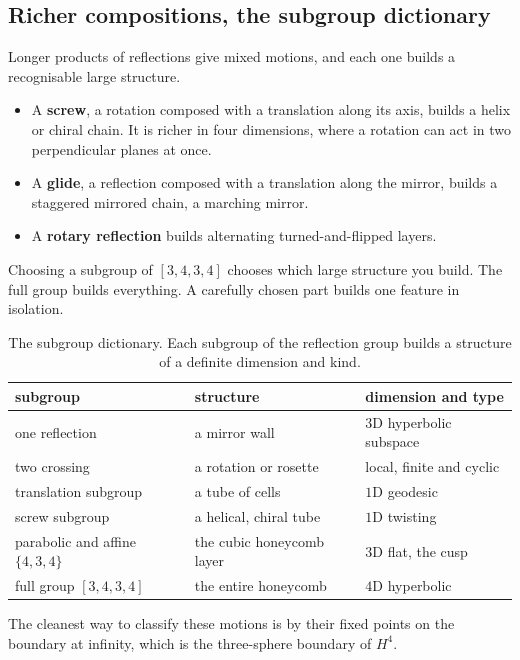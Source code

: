 \subsection{Richer compositions, the subgroup dictionary}

Longer products of reflections give mixed motions, and each one builds a recognisable large structure.

\begin{itemize}
\item A \textbf{screw}, a rotation composed with a translation along its axis, builds a helix or chiral chain. It is richer in four dimensions, where a rotation can act in two perpendicular planes at once.
\item A \textbf{glide}, a reflection composed with a translation along the mirror, builds a staggered mirrored chain, a marching mirror.
\item A \textbf{rotary reflection} builds alternating turned-and-flipped layers.
\end{itemize}

Choosing a subgroup of $[3,4,3,4]$ chooses which large structure you build. The full group builds everything. A carefully chosen part builds one feature in isolation.

\begin{table}[ht]
\centering
\begin{tabular}{@{}lll@{}}
\toprule
subgroup & structure & dimension and type \\
\midrule
one reflection & a mirror wall & $3$D hyperbolic subspace \\
two crossing & a rotation or rosette & local, finite and cyclic \\
translation subgroup & a tube of cells & $1$D geodesic \\
screw subgroup & a helical, chiral tube & $1$D twisting \\
parabolic and affine $\{4,3,4\}$ & the cubic honeycomb layer & $3$D flat, the cusp \\
full group $[3,4,3,4]$ & the entire honeycomb & $4$D hyperbolic \\
\bottomrule
\end{tabular}
\caption{The subgroup dictionary. Each subgroup of the reflection group builds a structure of a definite dimension and kind.}
\label{tab:subgroup-dictionary}
\end{table}

The cleanest way to classify these motions is by their fixed points on the boundary at infinity, which is the three-sphere boundary of $H^4$.

